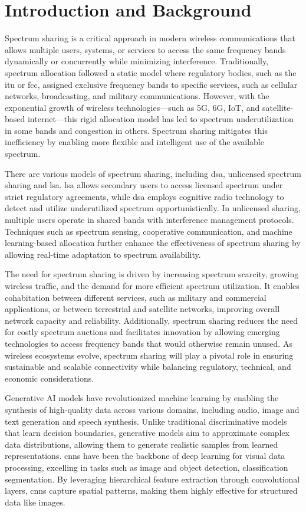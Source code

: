 \chapter{Introduction and Background}
\label{chap:introduction}

Spectrum sharing is a critical approach in modern wireless communications that allows multiple users, systems, or services to access the same frequency bands dynamically or concurrently while minimizing interference. Traditionally, spectrum allocation followed a static model where regulatory bodies, such as the  \gls{itu} or \gls{fcc}, assigned exclusive frequency bands to specific services, such as cellular networks, broadcasting, and military communications. However, with the exponential growth of wireless technologies—such as 5G, 6G, IoT, and satellite-based internet—this rigid allocation model has led to spectrum underutilization in some bands and congestion in others. Spectrum sharing mitigates this inefficiency by enabling more flexible and intelligent use of the available spectrum. 

There are various models of spectrum sharing, including \gls{dsa}, unlicensed spectrum sharing and \gls{lsa}. \gls{lsa} allows secondary users to access licensed spectrum under strict regulatory agreements, while \gls{dsa} employs cognitive radio technology to detect and utilize underutilized spectrum opportunistically. In unlicensed sharing, multiple users operate in shared bands  with interference management protocols. Techniques such as spectrum sensing, cooperative communication, and machine learning-based allocation further enhance the effectiveness of spectrum sharing by allowing real-time adaptation to spectrum availability. 

The need for spectrum sharing is driven by increasing spectrum scarcity, growing wireless traffic, and the demand for more efficient spectrum utilization. It enables cohabitation between different services, such as military and commercial applications, or between terrestrial and satellite networks, improving overall network capacity and reliability. Additionally, spectrum sharing reduces the need for costly spectrum auctions and facilitates innovation by allowing emerging technologies to access frequency bands that would otherwise remain unused. As wireless ecosystems evolve, spectrum sharing will play a pivotal role in ensuring sustainable and scalable connectivity while balancing regulatory, technical, and economic considerations.

Generative AI models have revolutionized machine learning by enabling the synthesis of high-quality data across various domains, including audio, image and text generation and speech synthesis. Unlike traditional discriminative models that learn decision boundaries, generative models aim to approximate complex data distributions, allowing them to generate realistic samples from learned representations. \gls{cnn}s have been the backbone of deep learning for visual data processing, excelling in tasks such as image and object detection, classification segmentation. By leveraging hierarchical feature extraction through convolutional layers, \gls{cnn}s capture spatial patterns, making them highly effective for structured data like images.



